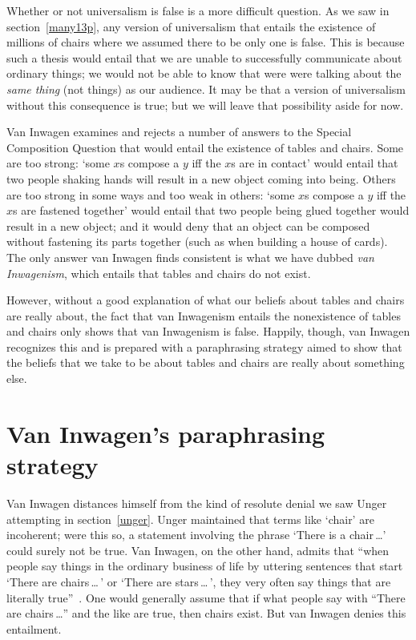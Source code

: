 \documentclass[11pt]{article}
\begin{document}
\begin{spacing}{1.5}
Whether or not universalism is false is a more difficult question.  As
we saw in section~\ref{many13p}, any version of universalism that
entails the existence of millions of chairs where we assumed there to
be only one is false.  This is because such a thesis would entail that
we are unable to successfully communicate about ordinary things; we
would not be able to know that were were talking about the {\em same
  thing} (not things) as our audience.  It may be that a version of
universalism without this consequence is true; but we will leave that
possibility aside for now.

Van Inwagen examines and rejects a number of answers to the Special
Composition Question that would entail the existence of tables and
chairs.  Some are too strong: `some $x$s compose a $y$ iff the $x$s
are in contact' would entail that two people shaking hands will result
in a new object coming into being.  Others are too strong in some ways
and too weak in others: `some $x$s compose a $y$ iff the $x$s are
fastened together' would entail that two people being glued together
would result in a new object; and it would deny that an object can be
composed without fastening its parts together (such as when building a
house of cards).  The only answer van Inwagen finds consistent is what
we have dubbed {\em van Inwagenism}, which entails that tables and
chairs do not exist.

However, without a good explanation of what our beliefs about tables
and chairs are really about, the fact that van Inwagenism entails the
nonexistence of tables and chairs only shows that van Inwagenism is
false.  Happily, though, van Inwagen recognizes this and is prepared
with a paraphrasing strategy aimed to show that the beliefs that we
take to be about tables and chairs are really about something else.

\section{Van Inwagen's paraphrasing strategy}
\label{inwagen}
Van Inwagen distances himself from the kind of resolute denial we saw
Unger attempting in section~\ref{unger}.  Unger maintained that terms
like `chair' are incoherent; were this so, a statement involving the
phrase `There is a chair\,\ldots ' could surely not be true.  Van
Inwagen, on the other hand, admits that ``when people say things in
the ordinary business of life by uttering sentences that start `There
are chairs\,\ldots\,' or `There are stars\,\ldots\,', they very often
say things that are literally true''~\cite[102]{inwagen1995}.  One
would generally assume that if what people say with ``There are
chairs\,\ldots '' and the like are true, then chairs exist.  But van
Inwagen denies this entailment.


\end{spacing}
\end{document}

